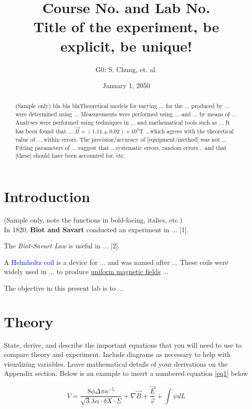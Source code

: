 \documentclass[letterpaper,11pt]{article}
\begin{document}
\title{Course No. and Lab No. \\\textbf{Title of the experiment, be explicit, be unique!}}
\author{G0: S. Chung, et. al.}
\date{January 1, 2050}
\maketitle

\begin{abstract}
(Sample only) bla bla blaTheoretical models for varying ... for the ... produced by ... were determined using ... Measurements were performed using ... and ... by means of ... Analyses were performed using techniques in ... and mathematical tools such as ... It has been found that ... $\vec{B}= (1.11 \pm 0.02)\times10^5\text{T}$ ...which agrees with the theoretical value of ... within errors. The precision/accuracy of [equipment/method] was not ... Fitting parameters of ... suggest that ...systematic errors, random errors... and that [these] should have been accounted for, etc.
\end{abstract}

\section{Introduction}

(Sample only, note the functions in bold-facing, italics, etc.) \\In 1820, \textbf{Biot and Savart} conducted an experiment in ... [1].

The \textit{Biot-Savart Law} is useful in ... [2].

A \textcolor{blue}{Helmholtz coil} is a device for ... and was named after ... These coils were widely used in ... to produce \underline{uniform magnetic fields} ...

The objective in this present lab is to ...

\section{Theory}

State, derive, and describe the important equations that you will need to use to compare theory and experiment. Include diagrams as necessary to help with visualizing variables. Leave mathematical details of your derivations on the Appendix section. Below is an example to insert a numbered equation \ref{eq1} below

\begin{equation} \label{eq1} %
V=\frac{8\phi\Delta\pi a^{-5}}{\sqrt{3}\lambda\alpha\cdot\delta X \cdot\Sigma}+\nabla\vec{B}+\frac{\vec{E}}{\vec{v}}+\int \psi dL
\end{equation}
\end{document}
